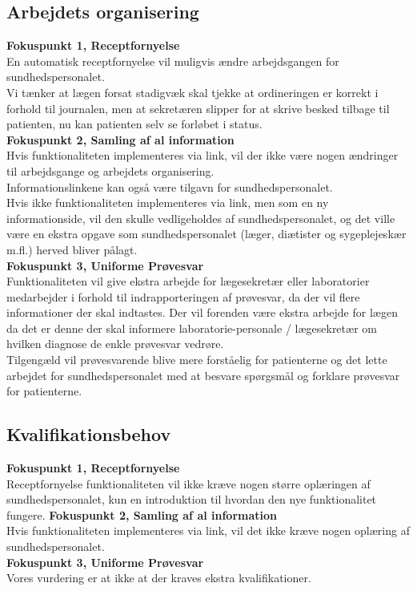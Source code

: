   \subsection{Arbejdets organisering}
\textbf{Fokuspunkt 1, Receptfornyelse} \\
En automatisk receptfornyelse vil muligvis ændre arbejdsgangen for sundhedspersonalet. \\ 
Vi tænker at lægen forsat stadigvæk skal tjekke at ordineringen er korrekt i forhold til journalen, men at sekretæren slipper for at skrive besked tilbage til patienten, nu kan patienten selv se forløbet i status.\\
\textbf{Fokuspunkt 2, Samling af al information} \\
Hvis funktionaliteten implementeres via link, vil der ikke være nogen ændringer til arbejdsgange og arbejdets organisering. \\
Informationslinkene kan også være tilgavn for sundhedspersonalet. \\
Hvis ikke funktionaliteten implementeres via link, men som en ny informationside, vil den skulle vedligeholdes af sundhedspersonalet, og det ville være en ekstra opgave som sundhedspersonalet (læger, diætister og sygeplejeskær m.fl.) herved bliver pålagt.\\
\textbf{Fokuspunkt 3, Uniforme Prøvesvar} \\
Funktionaliteten vil give ekstra arbejde for lægesekretær eller laboratorier medarbejder i forhold til indrapporteringen af prøvesvar, da der vil flere informationer der skal indtastes. Der vil forenden være ekstra arbejde for lægen da det er denne der skal informere laboratorie-personale / lægesekretær om hvilken diagnose de enkle prøvesvar vedrøre.\\
Tilgengæld vil prøvesvarende blive mere forståelig for patienterne og det lette arbejdet for sundhedspersonalet med at besvare spørgsmål og forklare prøvesvar for patienterne.
\subsection{Kvalifikationsbehov}
\textbf{Fokuspunkt 1, Receptfornyelse} \\
  Receptfornyelse funktionaliteten vil ikke kræve nogen større oplæringen af sundhedspersonalet, kun en introduktion til hvordan den nye funktionalitet fungere.
  \textbf{Fokuspunkt 2, Samling af al information} \\
  Hvis funktionaliteten implementeres via link, vil det ikke kræve nogen oplæring af sundhedspersonalet.\\
  \textbf{Fokuspunkt 3, Uniforme Prøvesvar} \\
  Vores vurdering er at ikke at der kraves ekstra kvalifikationer.